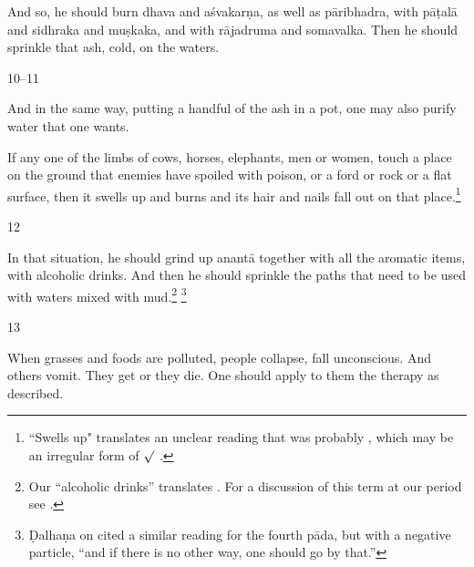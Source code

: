 \begin{translation}
And so, he should burn
    \gls{dhava}  and 
    \gls{aśvakarṇa}, %
        as well as
    \gls{pāribhadra}, %
        with
    \gls{pāṭalā} %
        and 
    \gls{sidhraka} %
        and 
   \gls{muṣkaka}, %
        and with
    \gls{rājadruma} %
        and 
    \gls{somavalka}.
Then he should sprinkle that ash, cold, on the waters.

\item [10--11]

And in the same way, putting a handful of the ash in a pot, one may also purify water that 
one wants.

If any one of the limbs of cows, horses, elephants, men or women, touch a place on
the ground that enemies have spoiled with poison, or a ford or rock or a flat
surface, then it swells up and burns and its hair and nails fall out on that
place.\footnote{``Swells up" translates an unclear reading that was probably
    , which may be an irregular form of $\surd$ 
    \citep[see][175--176]{whit-root}.}

\item [12]

In that situation, he should grind up \gls{anantā} together with all the aromatic
items, with alcoholic drinks.  And then  he should sprinkle the paths that need to
be used with waters mixed with mud.\footnote{Our “alcoholic drinks” translates
    .  For a discussion of this term at our period see \cite[37--39
    \emph{et passim}]{mchu-2021a}.} \footnote{Ḍalhaṇa on  cited a similar reading for the fourth
        pāda, but with a negative particle,  “and if there is no other way, one should go
        by that.”}
    
    

\item [13]

When grasses and foods are polluted, people collapse, fall unconscious. And others
vomit. They get  or they die.
One should apply to them the therapy as described.


\end{translation}
